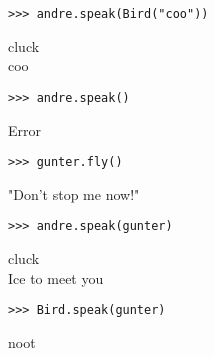 \newpage
\begin{blocksection}
\vspace{9\baselineskip}
\begin{lstlisting}
>>> andre.speak(Bird("coo"))
\end{lstlisting}
\begin{solution}[.2in]
cluck \\
coo
\end{solution}

\vspace{3\baselineskip}
\begin{lstlisting}
>>> andre.speak()
\end{lstlisting}
\begin{solution}[.2in]
Error
\end{solution}

\vspace{3\baselineskip}
\begin{lstlisting}
>>> gunter.fly()
\end{lstlisting}
\begin{solution}[.2in]
"Don't stop me now!"
\end{solution}

\vspace{3\baselineskip}
\begin{lstlisting}
>>> andre.speak(gunter)
\end{lstlisting}
\begin{solution}[.2in]
cluck \\
Ice to meet you
\end{solution}

\vspace{3\baselineskip}
\begin{lstlisting}
>>> Bird.speak(gunter)
\end{lstlisting}
\begin{solution}[.2in]
noot
\end{solution}
\end{blocksection}
\onecolumn

